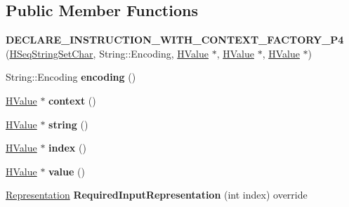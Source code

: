 \subsection*{Public Member Functions}
\begin{DoxyCompactItemize}
\item 
{\bfseries D\+E\+C\+L\+A\+R\+E\+\_\+\+I\+N\+S\+T\+R\+U\+C\+T\+I\+O\+N\+\_\+\+W\+I\+T\+H\+\_\+\+C\+O\+N\+T\+E\+X\+T\+\_\+\+F\+A\+C\+T\+O\+R\+Y\+\_\+\+P4} (\hyperlink{classv8_1_1internal_1_1_h_seq_string_set_char}{H\+Seq\+String\+Set\+Char}, String\+::\+Encoding, \hyperlink{classv8_1_1internal_1_1_h_value}{H\+Value} $\ast$, \hyperlink{classv8_1_1internal_1_1_h_value}{H\+Value} $\ast$, \hyperlink{classv8_1_1internal_1_1_h_value}{H\+Value} $\ast$)\hypertarget{classv8_1_1internal_1_1_h_seq_string_set_char_a2cd55e01d384facb99091900839128b3}{}\label{classv8_1_1internal_1_1_h_seq_string_set_char_a2cd55e01d384facb99091900839128b3}

\item 
String\+::\+Encoding {\bfseries encoding} ()\hypertarget{classv8_1_1internal_1_1_h_seq_string_set_char_a547a1d71bbda9ad9c8bbf1ce81849ec1}{}\label{classv8_1_1internal_1_1_h_seq_string_set_char_a547a1d71bbda9ad9c8bbf1ce81849ec1}

\item 
\hyperlink{classv8_1_1internal_1_1_h_value}{H\+Value} $\ast$ {\bfseries context} ()\hypertarget{classv8_1_1internal_1_1_h_seq_string_set_char_a38f4abdcfbaaa12735b894965f2d5c20}{}\label{classv8_1_1internal_1_1_h_seq_string_set_char_a38f4abdcfbaaa12735b894965f2d5c20}

\item 
\hyperlink{classv8_1_1internal_1_1_h_value}{H\+Value} $\ast$ {\bfseries string} ()\hypertarget{classv8_1_1internal_1_1_h_seq_string_set_char_a452929f3e6f8dddccc0a11098cb785df}{}\label{classv8_1_1internal_1_1_h_seq_string_set_char_a452929f3e6f8dddccc0a11098cb785df}

\item 
\hyperlink{classv8_1_1internal_1_1_h_value}{H\+Value} $\ast$ {\bfseries index} ()\hypertarget{classv8_1_1internal_1_1_h_seq_string_set_char_ace3c2a99431a650048c88a77d3271a1a}{}\label{classv8_1_1internal_1_1_h_seq_string_set_char_ace3c2a99431a650048c88a77d3271a1a}

\item 
\hyperlink{classv8_1_1internal_1_1_h_value}{H\+Value} $\ast$ {\bfseries value} ()\hypertarget{classv8_1_1internal_1_1_h_seq_string_set_char_a76f2b669a3719934eea6e3bf0c81384e}{}\label{classv8_1_1internal_1_1_h_seq_string_set_char_a76f2b669a3719934eea6e3bf0c81384e}

\item 
\hyperlink{classv8_1_1internal_1_1_representation}{Representation} {\bfseries Required\+Input\+Representation} (int index) override\hypertarget{classv8_1_1internal_1_1_h_seq_string_set_char_a09d4e272163b30f284addfa0c9572a7d}{}\label{classv8_1_1internal_1_1_h_seq_string_set_char_a09d4e272163b30f284addfa0c9572a7d}

\end{DoxyCompactItemize}
